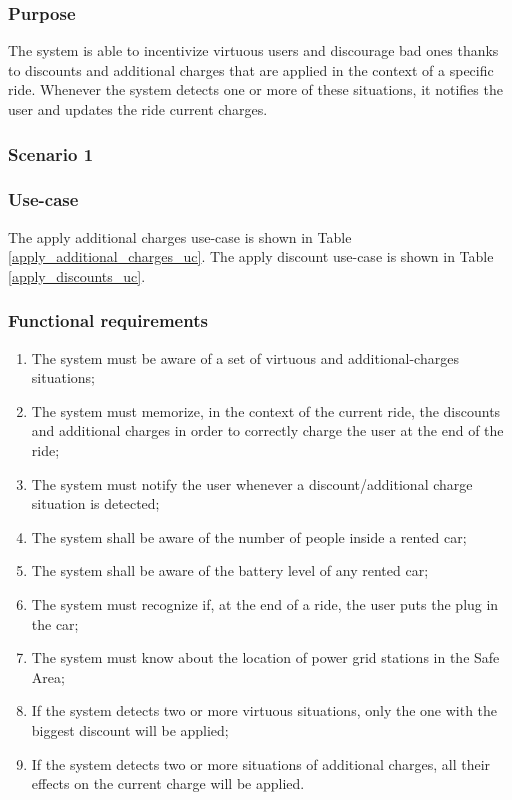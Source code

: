 \subsubsection{Purpose}
The system is able to incentivize virtuous users and discourage bad ones thanks to discounts and additional charges that are applied in the context of a specific ride. Whenever the system detects one or more of these situations, it notifies the user and updates the ride current charges.

\subsubsection{Scenario 1}

\subsubsection{Use-case}
The apply additional charges use-case is shown in Table \ref{apply_additional_charges_uc}.
The apply discount use-case is shown in Table \ref{apply_discounts_uc}.

\subsubsection{Functional requirements}
\begin{enumerate}
\item The system must be aware of a set of virtuous and additional-charges situations;
\item The system must memorize, in the context of the current ride, the discounts and additional charges in order to correctly charge the user at the end of the ride;
\item The system must notify the user whenever a discount/additional charge situation is detected;
\item The system shall be aware of the number of people inside a rented car;
\item The system shall be aware of the battery level of any rented car;
\item The system must recognize if, at the end of a ride, the user puts the plug in the car;
\item The system must know about the location of power grid stations in the Safe Area;
\item If the system detects two or more virtuous situations, only the one with the biggest discount will be applied;
\item If the system detects two or more situations of additional charges, all their effects on the current charge will be applied.
\end{enumerate}

